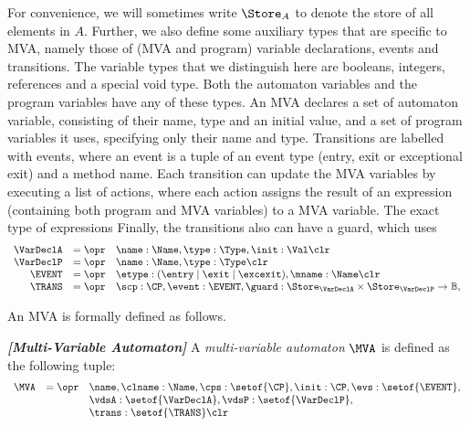 For convenience, we will sometimes write \(\Store_A\) to denote the
store of all elements in \(A\). Further, we also define some auxiliary
types that are specific to MVA, namely those of (MVA and program)
variable declarations, events and transitions. The variable types that
we distinguish here are booleans, integers, references and a special
void type.  Both the automaton variables and the program variables
have any of these types. An MVA declares a set of automaton variable,
consisting of their name, type and an initial value, and a set of
program variables it uses, specifying only their name and
type. Transitions are labelled with events, where an event is a tuple
of an event type (entry, exit or exceptional exit) and a method
name. Each transition can update the MVA variables by executing a list
of actions, where each action assigns the result of an expression
(containing both program and MVA variables) to
a MVA variable. The exact type of expressions Finally, the transitions also can have a guard, which
uses 
\[
\begin{array}{rcl}
\VarDeclA & = \opr & \name : \Name, \type : \Type, \init : \Val \clr\\
\VarDeclP & = \opr & \name : \Name, \type : \Type \clr\\
\EVENT & = \opr & \etype : (\entry \mid \exit \mid \excexit), 
                 \mname : \Name \clr\\
\TRANS & = \opr & \scp : \CP, \event : \EVENT, \guard :
\Store_{\VarDeclA} \times \Store_{\VarDeclP} \rightarrow \mathbb{B}, 
\end{array}
\]


An MVA is formally defined as follows.

\begin{definition}\textbf{\emph{[Multi-Variable Automaton]}}
A \emph{multi-variable automaton} \(\MVA\) is defined as the
following tuple:
\[
\begin{array}{rcl}
\MVA & = \opr & \name, \clname : \Name, \cps : \setof{\CP},
            \init : \CP, \evs : \setof{\EVENT},\\
     &   &  \vdsA : \setof{\VarDeclA}, \vdsP : \setof{\VarDeclP},\\
     &   &  \trans : \setof{\TRANS} \clr
\end{array}
\]
\end{definition}
